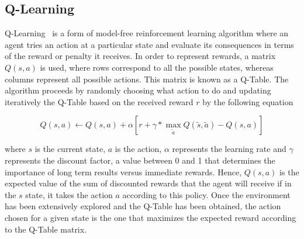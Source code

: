 \documentclass[journal]{IEEEtran}
\begin{document}
{%



\subsection{Q-Learning}{
\label{q_learning_step}

Q-Learning~\cite{Watkins1992} is a form of model-free reinforcement learning algorithm where an agent tries an action at a particular state and evaluate its consequences in terms of the reward or penalty it receives.  In order to represent rewards, a matrix $Q(s,a)$ is used, where rows correspond to all the possible states, whereas columns represent all possible actions.  This matrix is known as a Q-Table.  The algorithm proceeds by randomly choosing what action to do and updating iteratively the Q-Table based on the received reward $r$ by the following equation

\begin{equation}
    Q(s,a) \leftarrow Q(s,a) + \alpha[r+\gamma* \max_{\tilde{a}} Q(\tilde{s}, \tilde{a})-Q(s, a) ]
    \label{equ:update_q_table}
\end{equation}

\noindent where $s$ is the current state, $a$ is the action, $\alpha$ represents the learning rate and $\gamma$ represents the discount factor, a value between 0 and 1 that determines the importance of long term results versus immediate rewards.  Hence,  $Q(s,a)$  is the expected value of the sum of discounted rewards that the agent will receive if in the $s$ state, it takes the action $a$ according to this policy.  Once the environment has been extensively explored and the Q-Table has been obtained, the action chosen for a given state is the one that maximizes the expected reward according to the Q-Table matrix.

}}
\end{document}
